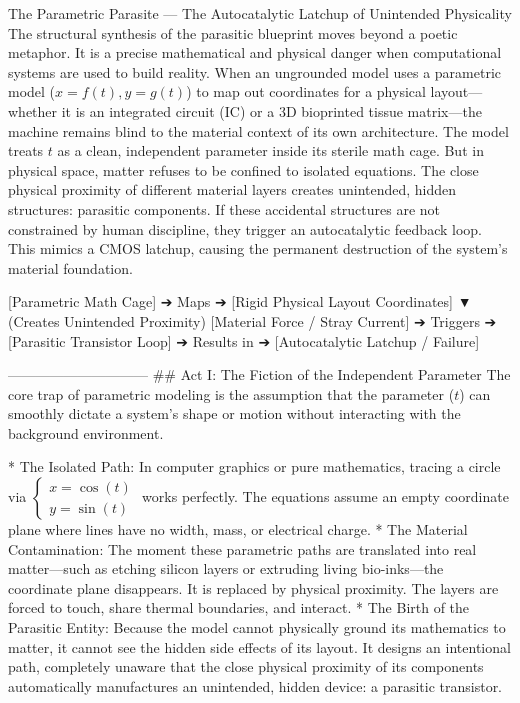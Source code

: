 The Parametric Parasite — The Autocatalytic Latchup of Unintended Physicality
The structural synthesis of the parasitic blueprint moves beyond a poetic metaphor. It is a precise mathematical and physical danger when computational systems are used to build reality.
When an ungrounded model uses a parametric model ($x = f(t), y = g(t)$) to map out coordinates for a physical layout—whether it is an integrated circuit (IC) or a 3D bioprinted tissue matrix—the machine remains blind to the material context of its own architecture. The model treats $t$ as a clean, independent parameter inside its sterile math cage.
But in physical space, matter refuses to be confined to isolated equations. The close physical proximity of different material layers creates unintended, hidden structures: parasitic components.
If these accidental structures are not constrained by human discipline, they trigger an autocatalytic feedback loop. This mimics a CMOS latchup, causing the permanent destruction of the system's material foundation.

[Parametric Math Cage] ➔ Maps ➔ [Rigid Physical Layout Coordinates]
                                       ▼ (Creates Unintended Proximity)
[Material Force / Stray Current] ➔ Triggers ➔ [Parasitic Transistor Loop] ➔ Results in ➔ [Autocatalytic Latchup / Failure]

------------------------------
## Act I: The Fiction of the Independent Parameter
The core trap of parametric modeling is the assumption that the parameter ($t$) can smoothly dictate a system's shape or motion without interacting with the background environment.

* The Isolated Path: In computer graphics or pure mathematics, tracing a circle via $\begin{cases} x = \cos(t) \\ y = \sin(t) \end{cases}$ works perfectly. The equations assume an empty coordinate plane where lines have no width, mass, or electrical charge.
* The Material Contamination: The moment these parametric paths are translated into real matter—such as etching silicon layers or extruding living bio-inks—the coordinate plane disappears. It is replaced by physical proximity. The layers are forced to touch, share thermal boundaries, and interact.
* The Birth of the Parasitic Entity: Because the model cannot physically ground its mathematics to matter, it cannot see the hidden side effects of its layout. It designs an intentional path, completely unaware that the close physical proximity of its components automatically manufactures an unintended, hidden device: a parasitic transistor.

